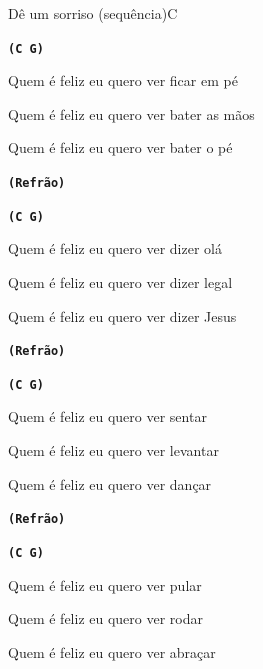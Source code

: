 \documentclass[a4,12pt,oneside]{book}
\begin{document}
\begin{song}{Dê um sorriso (sequência)}{C}
\begin{SBVerse*}
		{\normalsize\texttt{\textbf{(C G)}}}

		Quem é feliz eu quero ver ficar em pé
		
		Quem é feliz eu quero ver bater as mãos
		
		Quem é feliz eu quero ver bater o pé
		
		\textbf{\normalsize\texttt{(Refrão)}} 
		
		{\normalsize\texttt{\textbf{(C G)}}}

		Quem é feliz eu quero ver dizer olá
		
		Quem é feliz eu quero ver dizer legal
		
		Quem é feliz eu quero ver dizer Jesus
		
		\textbf{\normalsize\texttt{(Refrão)}} 
		
		{\normalsize\texttt{\textbf{(C G)}}}

		Quem é feliz eu quero ver sentar
		
		Quem é feliz eu quero ver levantar
		
		Quem é feliz eu quero ver dançar
		
		\textbf{\normalsize\texttt{(Refrão)}} 
		
		{\normalsize\texttt{\textbf{(C G)}}}

		Quem é feliz eu quero ver pular
		
		Quem é feliz eu quero ver rodar
		
		Quem é feliz eu quero ver abraçar	
	\end{SBVerse*}
\end{song}
\end{document}
